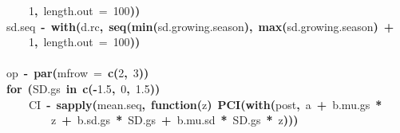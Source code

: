 \documentclass{article}
\makeatletter
\newcommand{\hlnumber}[1]{\textcolor[rgb]{0,0,0}{#1}}%
\newcommand{\hlfunctioncall}[1]{\textcolor[rgb]{.5,0,.33}{\textbf{#1}}}%
\newcommand{\hlkeyword}[1]{\textbf{#1}}%
\newcommand{\hlargument}[1]{\textcolor[rgb]{.69,.25,.02}{#1}}%
\newcommand{\hlformalargs}[1]{\hlargument{#1}}%
\newcommand{\hlassignement}[1]{\textbf{#1}}%
\newcommand{\hlsymbol}[1]{#1}%
\newcommand{\hlstd}[1]{\textcolor[rgb]{0,0,0}{#1}}%
\newenvironment{kframe}{%
 \def\FrameCommand##1{\hskip\@totalleftmargin \hskip-\fboxsep
 \colorbox{shadecolor}{##1}\hskip-\fboxsep
     \hskip-\linewidth \hskip-\@totalleftmargin \hskip\columnwidth}%
 \MakeFramed {\advance\hsize-\width
   \@totalleftmargin\z@ \linewidth\hsize
   \@setminipage}}%
 {\par\unskip\endMakeFramed}
\newenvironment{knitrout}{}{} %
\makeatother
\begin{document}
\begin{knitrout}
{\begin{kframe}
\begin{flushleft}
\hlstd{}{\ }{\ }{\ }{\ }\hlnumber{1}\hlkeyword{,}{\ }\hlargument{length.out}{\ }\hlargument{=}{\ }\hlnumber{100}\hlkeyword{)}\hlkeyword{)}\hspace*{\fill}\\
\hlstd{}\hlsymbol{sd.seq}{\ }\hlassignement{\usebox{\hlnormalsizeboxlessthan}-}{\ }\hlfunctioncall{with}\hlkeyword{(}\hlsymbol{d.rc}\hlkeyword{,}{\ }\hlfunctioncall{seq}\hlkeyword{(}\hlfunctioncall{min}\hlkeyword{(}\hlsymbol{sd.growing.season}\hlkeyword{)}\hlkeyword{,}{\ }\hlfunctioncall{max}\hlkeyword{(}\hlsymbol{sd.growing.season}\hlkeyword{)}{\ }\hlkeyword{+}\hspace*{\fill}\\
\hlstd{}{\ }{\ }{\ }{\ }\hlnumber{1}\hlkeyword{,}{\ }\hlargument{length.out}{\ }\hlargument{=}{\ }\hlnumber{100}\hlkeyword{)}\hlkeyword{)}\hspace*{\fill}\\
\hlstd{}\hspace*{\fill}\\
\hlstd{}\hlsymbol{op}{\ }\hlassignement{\usebox{\hlnormalsizeboxlessthan}-}{\ }\hlfunctioncall{par}\hlkeyword{(}\hlargument{mfrow}{\ }\hlargument{=}{\ }\hlfunctioncall{c}\hlkeyword{(}\hlnumber{2}\hlkeyword{,}{\ }\hlnumber{3}\hlkeyword{)}\hlkeyword{)}\hspace*{\fill}\\
\hlstd{}\hlkeyword{for}{\ }\hlkeyword{(}\hlsymbol{SD.gs}{\ }\hlkeyword{in}{\ }\hlfunctioncall{c}\hlkeyword{(}\hlkeyword{-}\hlnumber{1.5}\hlkeyword{,}{\ }\hlnumber{0}\hlkeyword{,}{\ }\hlnumber{1.5}\hlkeyword{)}\hlkeyword{)}{\ }\hlkeyword{\usebox{\hlnormalsizeboxopenbrace}}\hspace*{\fill}\\
\hlstd{}{\ }{\ }{\ }{\ }\hlsymbol{CI}{\ }\hlassignement{\usebox{\hlnormalsizeboxlessthan}-}{\ }\hlfunctioncall{sapply}\hlkeyword{(}\hlsymbol{mean.seq}\hlkeyword{,}{\ }\hlkeyword{function}\hlkeyword{(}\hlformalargs{z}\hlkeyword{)}{\ }\hlfunctioncall{PCI}\hlkeyword{(}\hlfunctioncall{with}\hlkeyword{(}\hlsymbol{post}\hlkeyword{,}{\ }\hlsymbol{a}{\ }\hlkeyword{+}{\ }\hlsymbol{b.mu.gs}{\ }\hlkeyword{*}\hspace*{\fill}\\
\hlstd{}{\ }{\ }{\ }{\ }{\ }{\ }{\ }{\ }\hlsymbol{z}{\ }\hlkeyword{+}{\ }\hlsymbol{b.sd.gs}{\ }\hlkeyword{*}{\ }\hlsymbol{SD.gs}{\ }\hlkeyword{+}{\ }\hlsymbol{b.mu.sd}{\ }\hlkeyword{*}{\ }\hlsymbol{SD.gs}{\ }\hlkeyword{*}{\ }\hlsymbol{z}\hlkeyword{)}\hlkeyword{)}\hlkeyword{)}\hspace*{\fill}\\

\end{flushleft}
\end{kframe}}
\end{knitrout}
\end{document}
